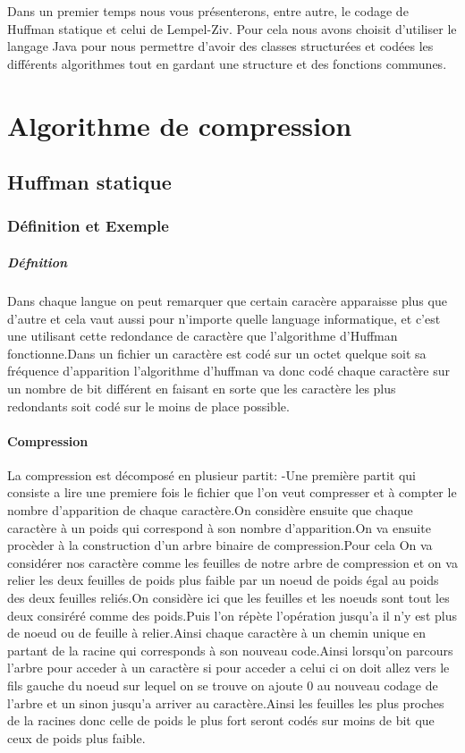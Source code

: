 \documentclass{report}
\begin{document}
Dans un premier temps nous vous présenterons, entre autre, le codage de Huffman statique et celui de Lempel-Ziv. 
Pour cela nous avons choisit d'utiliser le langage Java pour nous permettre d'avoir des classes structurées et codées les différents algorithmes tout en gardant une structure et des fonctions communes.
 \part*{Algorithme de compression}
\chapter*{Huffman statique}
\section*{Définition et Exemple }
\subsubsection*{Défnition}
Dans chaque langue on peut remarquer que certain caracère apparaisse plus que d'autre et cela vaut aussi pour n'importe quelle language informatique, et c'est une utilisant cette redondance de caractère que l'algorithme d'Huffman fonctionne.Dans un fichier un caractère est codé sur un octet quelque soit sa fréquence d'apparition l'algorithme d'huffman va donc codé chaque caractère sur un nombre de bit différent en faisant en sorte que les caractère les plus redondants soit codé sur le moins de place possible.
\subsection*{Compression}
La compression est décomposé en plusieur partit:
-Une première partit qui consiste a lire une premiere fois le fichier que l'on veut compresser et à compter le nombre d'apparition de chaque caractère.On considère ensuite que chaque caractère à un poids qui correspond à son nombre d'apparition.On va ensuite procèder à la construction d'un arbre binaire de compression.Pour cela On va considérer nos caractère comme les feuilles de notre arbre de compression et on va relier les deux feuilles de poids plus faible par un noeud de poids égal au poids des deux feuilles reliés.On considère ici que les feuilles et les noeuds sont tout les deux consiréré comme des poids.Puis l'on répète l'opération jusqu'a il n'y est plus de noeud ou de feuille à relier.Ainsi chaque caractère à un chemin unique en partant de la racine qui corresponds à son nouveau code.Ainsi lorsqu'on parcours l'arbre pour acceder à un caractère si pour acceder a celui ci on doit allez vers le fils gauche du noeud sur lequel on se trouve on ajoute 0 au nouveau codage de l'arbre et un sinon jusqu'a arriver au caractère.Ainsi les feuilles les plus proches de la racines donc celle de poids le plus fort seront codés sur moins de bit que ceux de poids plus faible.
\end{document}
